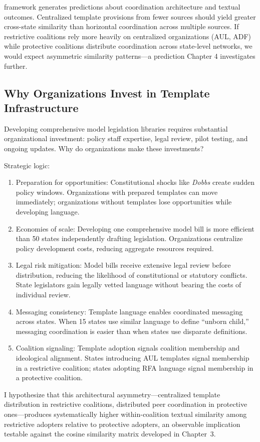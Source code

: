 \textcite{garrettInterestGroupInfluence2015} framework generates predictions about coordination architecture and textual outcomes. Centralized template provisions from fewer sources should yield greater cross-state similarity than horizontal coordination across multiple sources. If restrictive coalitions rely more heavily on centralized organizations (AUL, ADF) while protective coalitions distribute coordination across state-level networks, we would expect asymmetric similarity patterns---a prediction Chapter 4 investigates further.

\subsection{Why Organizations Invest in Template Infrastructure}

Developing comprehensive model legislation libraries requires substantial organizational investment: policy staff expertise, legal review, pilot testing, and ongoing updates. Why do organizations make these investments?

Strategic logic:

\begin{enumerate}
\item Preparation for opportunities: Constitutional shocks like \emph{Dobbs} create sudden policy windows. Organizations with prepared templates can move immediately; organizations without templates lose opportunities while developing language.

\item Economies of scale: Developing one comprehensive model bill is more efficient than 50 states independently drafting legislation. Organizations centralize policy development costs, reducing aggregate resources required.

\item Legal risk mitigation: Model bills receive extensive legal review before distribution, reducing the likelihood of constitutional or statutory conflicts. State legislators gain legally vetted language without bearing the costs of individual review.

\item Messaging consistency: Template language enables coordinated messaging across states. When 15 states use similar language to define ``unborn child,'' messaging coordination is easier than when states use disparate definitions.

\item Coalition signaling: Template adoption signals coalition membership and ideological alignment. States introducing AUL templates signal membership in a restrictive coalition; states adopting RFA language signal membership in a protective coalition.
\end{enumerate}
I hypothesize that this architectural asymmetry---centralized template distribution in restrictive coalitions, distributed peer coordination in protective ones---produces systematically higher within-coalition textual similarity among restrictive adopters relative to protective adopters, an observable implication testable against the cosine similarity matrix developed in Chapter~3.

